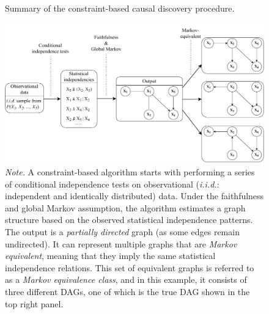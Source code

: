 \documentclass[twoside, 11pt]{article}
\begin{document}
\begin{figure}[t]
    \centering
        \caption{Summary of the constraint-based causal discovery procedure.}
        \includegraphics[width=1.0\textwidth]{figures/Fig3.pdf}
        \vspace{0.1mm}
        \caption*{\small{\textit{Note.} A constraint-based algorithm starts with performing a series of conditional independence tests on observational (\textit{i.i.d.}: independent and identically distributed) data. Under the faithfulness and global Markov assumption, the algorithm estimates a graph structure based on the observed statistical independence patterns. The output is a \textit{partially directed} graph (as some edges remain undirected). It can represent multiple graphs that are \textit{Markov equivalent}, meaning that they imply the same statistical independence relations. This set of equivalent graphs is referred to as a \textit{Markov equivalence class}, and in this example, it consists of three different DAGs, one of which is the true DAG shown in the top right panel.}}
    \label{fig:3}
\end{figure}
\end{document}
